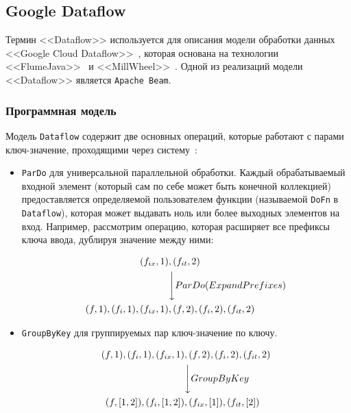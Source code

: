 \subsection{Google Dataflow}

Термин <<Dataflow>> используется для описания модели обработки данных <<Google Cloud Dataflow>>~\cite{dataflow}, которая основана на технологии <<FlumeJava>>~\cite{flumejava} и <<MillWheel>>~\cite{millwheel}.
Одной из реализаций модели <<Dataflow>> является \texttt{Apache Beam}.
\subsubsection{Программная модель}

Модель \texttt{Dataflow} содержит две основных операций, которые работают с парами ключ-значение, проходящими через систему~\cite{dataflow-paper}:

\begin{itemize}
  \item \texttt{ParDo} для универсальной параллельной обработки. 
    Каждый обрабатываемый входной элемент (который сам по себе может быть конечной коллекцией) предоставляется определяемой пользователем функции (называемой \texttt{DoFn} в \texttt{Dataflow}), которая может выдавать ноль или более выходных элементов на вход. 
    Например, рассмотрим операцию, которая расширяет все префиксы ключа ввода, дублируя значение между ними:

    \[
    \begin{split}
      (f_{ix}, 1)&, (f_{it}, 2) \\
      &\Bigg\downarrow ParDo(ExpandPrefixes) \\
      (f, 1), (f_{i}, 1), (f_{ix}, 1)&, (f, 2), (f_{i}, 2), (f_{it}, 2) 
    \end{split}
  \]
\item \texttt{GroupByKey} для группируемых пар ключ-значение по ключу.

    \[
    \begin{split}
      (f, 1), (f_{i}, 1), (f_{ix}, 1)&, (f, 2), (f_{i}, 2), (f_{it}, 2) \\
      &\Bigg\downarrow GroupByKey \\
      (f, [1, 2]), (f_{i}, [1, 2])&, (f_{ix}, [1]), (f_{it}, [2]) 
    \end{split}
  \]
\end{itemize}

